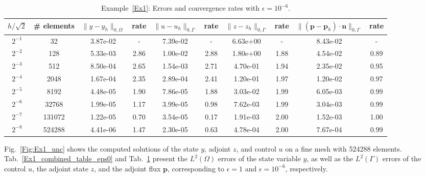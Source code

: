 \documentclass[a4paper,10pt]{article}
\newcommand{\bp}{{\mathbf{p}}}
\numberwithin{theorem}{section}
\begin{document}
\begin{table}[H]
\centering
\caption{Example~\ref{Ex1}: Errors and convergence rates with $\epsilon=10^{-6}$.}
\resizebox{\textwidth}{!}
{%
\begin{tabular}{c | c | c c | c c | c c | c c}
$h/\sqrt{2}$
&\# elements
& $\|y-y_h\|_{0,\Omega}$ & rate
& $\|u-u_h\|_{0,\Gamma}$ & rate
& $\|z-z_h\|_{0,\Gamma}$ & rate
& $\|(\bp-\bp_h)\cdot \mathbf n\|_{0,\Gamma}$ & rate \\
\hline
$2^{-1}$
&32
& 3.87e-02 & -
& 7.39e-02 & -
& 6.63e+00 & -
& 8.43e-02 & - \\

$2^{-2}$
&128
& 5.33e-03 & 2.86
& 1.00e-02 & 2.88
& 1.80e+00 & 1.88
& 4.54e-02 & 0.89 \\

$2^{-3}$
&512
& 8.50e-04 & 2.65
& 1.54e-03 & 2.71
& 4.70e-01 & 1.94
& 2.35e-02 & 0.95 \\

$2^{-4}$
&2048
& 1.67e-04 & 2.35
& 2.89e-04 & 2.41
& 1.20e-01 & 1.97
& 1.20e-02 & 0.97 \\

$2^{-5}$
&8192
& 4.48e-05 & 1.90
& 7.86e-05 & 1.88
& 3.03e-02 & 1.99
& 6.05e-03 & 0.99 \\

$2^{-6}$
&32768
& 1.99e-05 & 1.17
& 3.99e-05 & 0.98
& 7.62e-03 & 1.99
& 3.04e-03 & 0.99 \\

$2^{-7}$
&131072
& 1.22e-05 & 0.70
& 3.54e-05 & 0.17
& 1.91e-03 & 2.00
& 1.52e-03 & 1.00 \\

$2^{-8}$
&524288
& 4.41e-06 & 1.47
& 2.30e-05 & 0.63
& 4.78e-04 & 2.00
& 7.67e-04 & 0.99 \\

\hline
\end{tabular}
}
\label{Ex1_combined_table_eps6}
\end{table}



Fig.~\ref{Fig:Ex1_unc} shows the computed solutions of the state $y$, adjoint $z$, and control $u$ on a fine mesh with 524288 elements. Tab.~\ref{Ex1_combined_table_eps0} and Tab.~\ref{Ex1_combined_table_eps6} present the $L^2(\Omega)$ errors of the state variable $y$, as well as the $L^2(\Gamma)$ errors of the control $u$, the adjoint state $z$, and the adjoint flux $\bp$, corresponding to $\epsilon = 1$ and $\epsilon = 10^{-6}$, respectively. 


\end{document}
